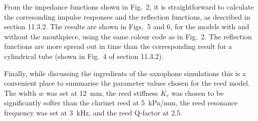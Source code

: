   From the impedance functions shown in Fig.\ 2, it is straightforward to 
  calculate the corresonding impulse responses and the reflection functions, as 
  described in section 11.3.2. The results are shown in Figs.\ 5 and 6, for the 
  models with and without the mouthpiece, using the same colour code as in 
  Fig.\ 2. The reflection functions are more spread out in time than the 
  corresponding result for a cylindrical tube (shown in Fig.\ 4 of section 
  11.3.2). 



  Finally, while discussing the ingredients of the saxophone simulations this 
  is a convenient place to summarise the parameter values chosen for the reed 
  model. The width $w$ was set at 12~mm, the reed stiffness $K_r$ was chosen to 
  be significantly softer than the clarinet reed at 5~kPa/mm, the reed 
  resonance frequency was set at 3~kHz, and the reed Q-factor at 2.5. 